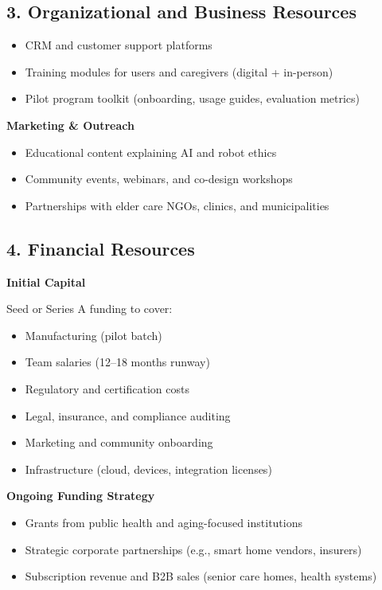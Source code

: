 \documentclass[
  letterpaper,
  DIV=11,
  numbers=noendperiod]{scrartcl}
\providecommand{\tightlist}{%
  \setlength{\itemsep}{0pt}\setlength{\parskip}{0pt}}\usepackage{longtable,booktabs,array}
\begin{document}
\subsection{3. Organizational and Business
Resources}\label{organizational-and-business-resources}

\begin{itemize}
\tightlist
\item
  CRM and customer support platforms
\item
  Training modules for users and caregivers (digital + in-person)
\item
  Pilot program toolkit (onboarding, usage guides, evaluation metrics)
\end{itemize}

\textbf{Marketing \& Outreach}

\begin{itemize}
\tightlist
\item
  Educational content explaining AI and robot ethics
\item
  Community events, webinars, and co-design workshops
\item
  Partnerships with elder care NGOs, clinics, and municipalities
\end{itemize}

\subsection{4. Financial Resources}\label{financial-resources}

\textbf{Initial Capital}

Seed or Series A funding to cover:

\begin{itemize}
\tightlist
\item
  Manufacturing (pilot batch)
\item
  Team salaries (12--18 months runway)
\item
  Regulatory and certification costs
\item
  Legal, insurance, and compliance auditing
\item
  Marketing and community onboarding
\item
  Infrastructure (cloud, devices, integration licenses)
\end{itemize}

\textbf{Ongoing Funding Strategy}

\begin{itemize}
\tightlist
\item
  Grants from public health and aging-focused institutions
\item
  Strategic corporate partnerships (e.g., smart home vendors, insurers)
\item
  Subscription revenue and B2B sales (senior care homes, health systems)
\end{itemize}
\end{document}
